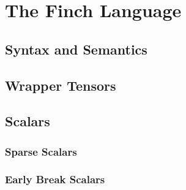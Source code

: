 
\section{The Finch Language}

\subsection{Syntax and Semantics}


\subsection{Wrapper Tensors}

\subsection{Scalars}

\subsubsection{Sparse Scalars}
\subsubsection{Early Break Scalars}

